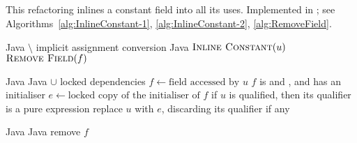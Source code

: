 \subsection{}
This refactoring inlines a constant field into all its uses. Implemented in ; see Algorithms~\ref{alg:InlineConstant-1}, \ref{alg:InlineConstant-2}, \ref{alg:RemoveField}.

\begin{algorithm}[p]
\caption{$\refactoring{Inline Constant}(f : \type{Field})$}
\label{alg:InlineConstant-1}
\begin{algorithmic}[1]
\REQUIRE Java $\setminus$ implicit assignment conversion
\ENSURE Java
\medskip
{}
  \STATE $\textsc{Inline Constant}(u)$
\ENDFOR
\STATE $\textsc{Remove Field}(f)$
\end{algorithmic}
\end{algorithm}

\begin{algorithm}[p]
\caption{$\refactoring{Inline Constant}(u : \type{FieldAccess})$}
\label{alg:InlineConstant-2}
\begin{algorithmic}[1]
\REQUIRE Java
\ENSURE Java $\cup$ locked dependencies
\medskip
\STATE $f \leftarrow \text{field accessed by $u$}$
\STATE \assert $f$ is  and , and has an initialiser
\STATE $e \leftarrow \text{locked copy of the initialiser of $f$}$
\STATE \assert if $u$ is qualified, then its qualifier is a pure expression
\STATE replace $u$ with $e$, discarding its qualifier if any
\end{algorithmic}
\end{algorithm}

\begin{algorithm}[p]
\caption{$\refactoring{Remove Field}(f : \type{Field})$}
\label{alg:RemoveField}
\begin{algorithmic}[1]
\REQUIRE Java
\ENSURE Java
\medskip
{}
  \STATE remove $f$
\ENDIF
\end{algorithmic}
\end{algorithm}
